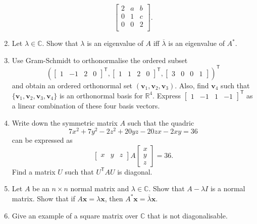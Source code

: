 \documentclass[12pt]{article}
\begin{document}
\begin{enumerate}[leftmargin=*]
	 \begin{equation*} 
	 	\begin{bmatrix}
	 		2 & a & b \\
	 		0 & 1 & c \\
	 		0 & 0 & 2 \\
	 	\end{bmatrix}.
	 \end{equation*}
	 \item Let $\lambda \in \mathbb{C}$. Show that $\lambda$ is an eigenvalue of $A$ iff $\overline{\lambda}$ is an eigenvalue of $A^{\ast}$. 
	 \item Use Gram-Schmidt to orthonormalise the ordered subset
	 \begin{equation*} 
	 	(\begin{bmatrix}
	 		1 & -1 & 2 & 0
	 	\end{bmatrix}^{\mathsf{T}},
	 	\begin{bmatrix}
	 		1 & 1 & 2 & 0
	 	\end{bmatrix}^{\mathsf{T}},
	 	\begin{bmatrix}
	 		3 & 0 & 0 & 1
	 	\end{bmatrix})^{\mathsf{T}}
	 \end{equation*}
	 and obtain an ordered orthonormal set $(\mathbf{v}_{1}, \mathbf{v}_{2}, \mathbf{v}_{3})$. Also, find $\mathbf{v}_{4}$ such that $\{\mathbf{v}_{1}, \mathbf{v}_{2}, \mathbf{v}_{3}, \mathbf{v}_{4}\}$ is an orthonormal basis for $\mathbb{R}^{4}$. \newline
	 Express $\begin{bmatrix}
	 		1 & -1 & 1 & -1
	 	\end{bmatrix}^{\mathsf{T}}$ as a linear combination of these four basis vectors.
	 \item Write down the symmetric matrix $A$ such that the quadric
	 \begin{equation*} 
	 	7x^{2} + 7y^{2} - 2z^{2} + 20yz - 20zx - 2xy = 36
	 \end{equation*}
	 can be expressed as
	 \begin{equation*} 
	 	\begin{bmatrix}
	 		x & y & z
	 	\end{bmatrix} A 
	 	\begin{bmatrix}
	 		x \\
	 		y \\
	 		z
	 	\end{bmatrix} = 36.
	 \end{equation*}
	 Find a matrix $U$ such that $U^{\mathsf{T}}AU$ is diagonal.
	 \item Let $A$ be an $n \times n$ normal matrix and $\lambda \in \mathbb{C}$. \newline
	 Show that $A - \lambda I$ is a normal matrix. \newline
	 Show that if $A \mathbf{x} = \lambda \mathbf{x}$, then $A^{\ast} \mathbf{x} = \overline{\lambda} \mathbf{x}$.
	 \item Give an example of a square matrix over $\mathbb{C}$ that is not diagonalisable.
\end{enumerate}
\end{document}
